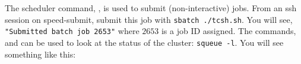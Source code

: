 The scheduler command, , is used to submit (non-interactive) jobs. 
From an ssh session on speed-submit, submit this job with \texttt{sbatch ./tcsh.sh}.
You will see, \texttt{"Submitted batch job 2653"} where $2653$ is a job ID assigned.
The commands,  and  can be used 
to look at the status of the cluster: \texttt{squeue -l}.
You will see something like this: 


